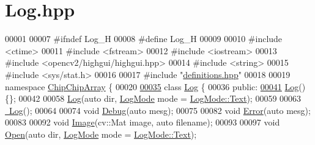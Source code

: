 \hypertarget{Log_8hpp_source}{\section{Log.\+hpp}
\label{Log_8hpp_source}
}

\begin{DoxyCode}
00001 
00007 \textcolor{preprocessor}{#ifndef Log\_H}
00008 \textcolor{preprocessor}{#define Log\_H}
00009 
00010 \textcolor{preprocessor}{#include <ctime>}
00011 \textcolor{preprocessor}{#include <fstream>}
00012 \textcolor{preprocessor}{#include <iostream>}
00013 \textcolor{preprocessor}{#include <opencv2/highgui/highgui.hpp>}
00014 \textcolor{preprocessor}{#include <string>}
00015 \textcolor{preprocessor}{#include <sys/stat.h>}
00016 
00017 \textcolor{preprocessor}{#include "\hyperlink{definitions_8hpp}{definitions.hpp}"}
00018 
00019 \textcolor{keyword}{namespace }\hyperlink{namespaceChipChipArray}{ChipChipArray} \{
00020 
\hypertarget{Log_8hpp_source_l00035}{}\hyperlink{classChipChipArray_1_1Log}{00035}     \textcolor{keyword}{class }\hyperlink{classChipChipArray_1_1Log}{Log} \{
00036         \textcolor{keyword}{public}:
\hypertarget{Log_8hpp_source_l00041}{}\hyperlink{classChipChipArray_1_1Log_a2bd48afdb832567e94545e6dc2f6f4d5}{00041}             \hyperlink{classChipChipArray_1_1Log_a2bd48afdb832567e94545e6dc2f6f4d5}{Log}() \{\};
00042 
00058             \hyperlink{classChipChipArray_1_1Log_a2bd48afdb832567e94545e6dc2f6f4d5}{Log}(\textcolor{keyword}{auto} dir, \hyperlink{definitions_8hpp_aa7380b6d694cab49f07aed6a7af592d9}{LogMode} mode = \hyperlink{definitions_8hpp_aa7380b6d694cab49f07aed6a7af592d9a9dffbf69ffba8bc38bc4e01abf4b1675}{LogMode::Text});
00059 
00063             \hyperlink{classChipChipArray_1_1Log_a647df4da22b29d9d5a5ea32af3a1ed83}{~Log}();
00064 
00074             \textcolor{keywordtype}{void} \hyperlink{classChipChipArray_1_1Log_ac32b435af1577e4ebc67af2bdfea8eff}{Debug}(\textcolor{keyword}{auto} mesg);
00075 
00082             \textcolor{keywordtype}{void} \hyperlink{classChipChipArray_1_1Log_aba7b7b0555f49f4dcf15f4b9fd3e6b34}{Error}(\textcolor{keyword}{auto} mesg);
00083 
00092             \textcolor{keywordtype}{void} \hyperlink{classChipChipArray_1_1Log_a65bbab057c8b1453f9e4efcfee7522c4}{Image}(cv::Mat image, \textcolor{keyword}{auto} filename);
00093 
00097             \textcolor{keywordtype}{void} \hyperlink{classChipChipArray_1_1Log_ad27a06a4561f2f59159bd8a7fc2fed3b}{Open}(\textcolor{keyword}{auto} dir, \hyperlink{definitions_8hpp_aa7380b6d694cab49f07aed6a7af592d9}{LogMode} mode = \hyperlink{definitions_8hpp_aa7380b6d694cab49f07aed6a7af592d9a9dffbf69ffba8bc38bc4e01abf4b1675}{LogMode::Text});

\end{DoxyCode}
